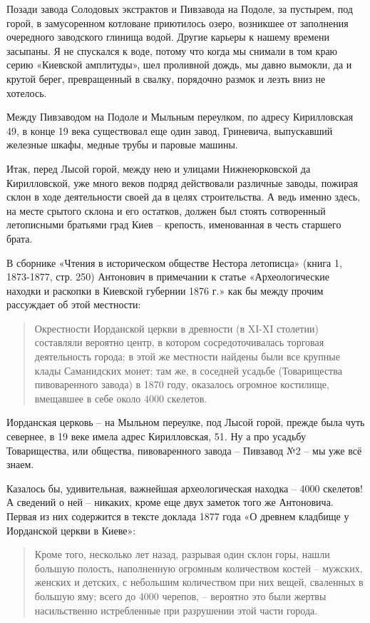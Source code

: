 Позади завода Солодовых экстрактов и Пивзавода на Подоле, за пустырем, под горой, в замусоренном котловане приютилось озеро, возникшее от заполнения очередного заводского глинища водой. Другие карьеры к нашему времени засыпаны. Я не спускался к воде, потому что когда мы снимали в том краю серию «Киевской амплитуды», шел проливной дождь, мы давно вымокли, да и крутой берег, превращенный в свалку, порядочно размок и лезть вниз не хотелось.

Между Пивзаводом на Подоле и Мыльным переулком, по адресу Кирилловская 49, в конце 19 века существовал еще один завод, Гриневича, выпускавший железные шкафы, медные трубы и паровые машины.

Итак, перед Лысой горой, между нею и улицами Нижнеюрковской да Кирилловской, уже много веков подряд действовали различные заводы, пожирая склон в ходе деятельности своей да в целях строительства. А ведь именно здесь, на месте срытого склона и его остатков, должен был стоять сотворенный летописными братьями град Киев – крепость, именованная в честь старшего брата. 

В сборнике «Чтения в историческом обществе Нестора летописца» (книга 1, 1873-1877, стр. 250) Антонович в примечании к статье «Археологические находки и раскопки в Киевской губернии 1876 г.» как бы между прочим рассуждает об этой местности:

\begin{quotation}
Окрестности Иорданской церкви в древности (в XI-XI столетии) составляли вероятно центр, в котором сосредоточивалась торговая деятельность города; в этой же местности найдены были все крупные клады Саманидских монет; там же, в соседней усадьбе (Товарищества пивоваренного завода) в 1870 году, оказалось огромное костилище, вмещавшее в себе около 4000 скелетов.
\end{quotation}

Иорданская церковь – на Мыльном переулке, под Лысой горой, прежде была чуть севернее, в 19 веке имела адрес Кирилловская, 51. Ну а про усадьбу Товарищества, или общества, пивоваренного завода – Пивзавод №2 – мы уже всё знаем.

Казалось бы, удивительная, важнейшая археологическая находка – 4000 скелетов! А сведений о ней – никаких, кроме еще двух заметок того же Антоновича. Первая из них содержится в тексте доклада 1877 года «О древнем кладбище у Иорданской церкви в Киеве»:

\begin{quotation}
Кроме того, несколько лет назад, разрывая один склон горы, нашли большую полость, наполненную огромным количеством костей – мужских, женских и детских, с небольшим количеством при них вещей, сваленных в большую яму; всего до 4000 черепов, – вероятно это были жертвы насильственно истребленные при разрушении этой части города.
\end{quotation}

